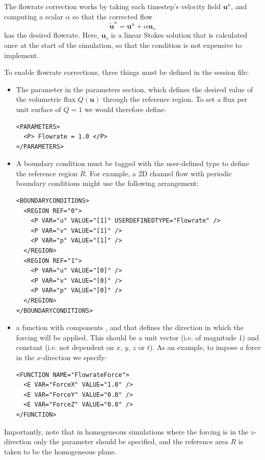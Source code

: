 The flowrate correction works by taking each timestep's velocity field
$\mathbf{u}^{n}$, and computing a scalar $\alpha$ so that the corrected flow
%
\[
  \tilde{\mathbf{u}}^n = \mathbf{u}^n + \alpha\mathbf{u}_s
\]
has the desired flowrate. Here, $\mathbf{u}_s$ is a linear Stokes solution that
is calculated once at the start of the simulation, so that the condition is not
expensive to implement.

To enable flowrate corrections, three things must be defined in the session
file:

\begin{itemize}
  \item The  parameter in the parameters section, which defines
  the desired value of the volumetric flux $Q(\mathbf{u})$ through the reference
  region. To set a flux per unit surface of $Q = 1$ we would therefore define:
\begin{lstlisting}[style=XMLStyle]
<PARAMETERS>
  <P> Flowrate = 1.0 </P>
</PARAMETERS>
\end{lstlisting}
  \item A boundary condition must be tagged with the 
  user-defined type to define the reference region $R$. For example, a 2D
  channel flow with periodic boundary conditions might use the following
  arrangement:
\begin{lstlisting}[style=XMLStyle]
<BOUNDARYCONDITIONS>
  <REGION REF="0">
    <P VAR="u" VALUE="[1]" USERDEFINEDTYPE="Flowrate" />
    <P VAR="v" VALUE="[1]" />
    <P VAR="p" VALUE="[1]" />
  </REGION>
  <REGION REF="1">
    <P VAR="u" VALUE="[0]" />
    <P VAR="v" VALUE="[0]" />
    <P VAR="p" VALUE="[0]" />
  </REGION>
</BOUNDARYCONDITIONS>
\end{lstlisting}
  \item a  function with components ,
   and  that defines the direction in which the
  forcing will be applied. This should be a unit vector (i.e. of magnitude 1)
  and constant (i.e. not dependent on $x$, $y$, $z$ or $t$). As an example, to
  impose a force in the $x$-direction we specify:
\begin{lstlisting}[style=XMLStyle]
<FUNCTION NAME="FlowrateForce">
  <E VAR="ForceX" VALUE="1.0" />
  <E VAR="ForceY" VALUE="0.0" />
  <E VAR="ForceZ" VALUE="0.0" />
</FUNCTION>
\end{lstlisting}
\end{itemize}

Importantly, note that in homogeneous simulations where the forcing is in the
$z$-direction only the  parameter should be specified, and the
reference area $R$ is taken to be the homogeneous plane.

